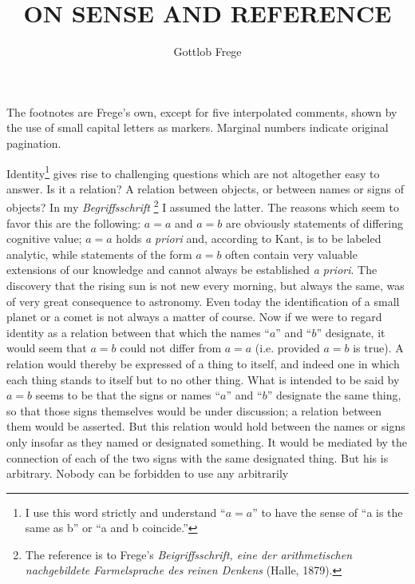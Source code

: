 \documentclass[twoside,12pt]{article}
\newcommand{\footnoteAlph}[2][\thefootnote]{%
  \renewcommand{\thefootnote}{\Alph{footnote}}%
  \footnote[#1]{#2}%
  \renewcommand{\thefootnote}{\arabic{footnote}}}
\begin{document}
The footnotes are Frege's own, except for five interpolated comments,
shown by the use of small capital letters as markers. Marginal numbers
indicate original pagination.


\newpage
\lfoot{}
\rfoot{}
\title{\vspace{-2em}ON SENSE AND REFERENCE}
\author{Gottlob Frege}
\date{\vspace{-2em}}
\maketitle

Identity\footnote[1]{I use this word strictly and understand ``$a=a$''
  to have the sense of ``a is the same as b'' or ``a and b
  coincide.''} gives rise to challenging questions which are not
altogether easy to answer. Is it a relation? A relation between
objects, or between names or signs of objects? In my {\it
  Begriffsschrift}\footnoteAlph[1]{The reference is to Frege's {\it
    Beigriffsschrift, eine der arithmetischen nachgebildete
    Farmelsprache des reinen Denkens} (Halle, 1879).} I assumed the
latter. The reasons which seem to favor this are the following: $a=a$
and $a=b$ are obviously statements of differing cognitive value; $a=a$
holds {\it a priori} and, according to Kant, is to be labeled
analytic, while statements of the form $a=b$ often contain very
valuable extensions of our knowledge and cannot always be established
{\it a priori}. The discovery that the rising sun is not new every
morning, but always the same, was of very great consequence to
astronomy. Even today the identification of a small planet or a comet
is not always a matter of course. 
Now if we were to regard identity as a relation between that which the
names ``$a$'' and ``$b$'' designate, it would seem that $a=b$ could
not differ from $a=a$ (i.e. provided $a=b$ is true). A relation would
thereby be expressed of a thing to itself, and indeed one in which
each thing stands to itself but to no other thing. What is intended to
be said by $a=b$ seems to be that the signs or names ``$a$'' and
``$b$'' designate the same thing, so that those signs themselves would
be under discussion; a relation between them would be asserted. But
this relation would hold between the names or signs only insofar as
they named or designated something. It would be mediated by the
connection of each of the two signs with the same designated thing.
But his is arbitrary. Nobody can be forbidden to use any arbitrarily
\end{document}
